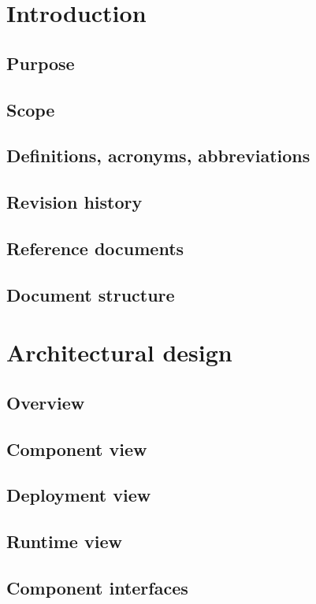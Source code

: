 \documentclass[11pt,twoside]{article}
\begin{document}
\newpage

\tableofcontents

\newpage

\section{Introduction}
	\subsection{Purpose}
	\subsection{Scope}
	\subsection{Definitions, acronyms, abbreviations}
	\subsection{Revision history}
	\subsection{Reference documents}
	\subsection{Document structure}

\section{Architectural design}
	\subsection{Overview}
	\subsection{Component view}
	\subsection{Deployment view}
	\subsection{Runtime view}
	\subsection{Component interfaces}
\end{document}
